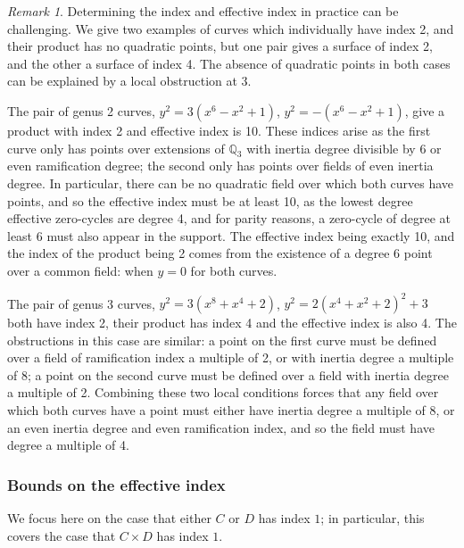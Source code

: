 \documentclass[a4paper,11pt]{amsart}
\theoremstyle{plain}
\theoremstyle{remark}
\newtheorem{remark}[thm]{Remark}
\begin{document}
\begin{remark}
    Determining the index and effective index in practice can be challenging. We give two examples of curves which individually have index 2, and their product has no quadratic points, but one pair gives a surface of index 2, and the other a surface of index 4. The absence of quadratic points in both cases can be explained by a local obstruction at 3.
    
    The pair of genus 2 curves, $y^2 = 3(x^6 - x^2 + 1)$, $y^2 = -(x^6 - x^2 + 1)$, give a product with index 2 and effective index is 10. These indices arise as the first curve only has points over extensions of $\mathbb{Q}_3$ with inertia degree divisible by 6 or even ramification degree; the second only has points over fields of even inertia degree. In particular, there can be no quadratic field over which both curves have points, and so the effective index must be at least 10, as the lowest degree effective zero-cycles are degree 4, and for parity reasons, a zero-cycle of degree at least 6 must also appear in the support. The effective index being exactly 10, and the index of the product being 2 comes from the existence of a degree 6 point over a common field: when $y = 0$ for both curves. 
    
    The pair of genus 3 curves, $y^2 = 3(x^8 + x^4 + 2)$, $y^2 = 2(x^4 + x^2 + 2)^2 + 3$ both have index 2, their product has index 4 and the effective index is also 4. The obstructions in this case are similar: a point on the first curve must be defined over a field of ramification index a multiple of 2, or with inertia degree a multiple of 8; a point on the second curve must be defined over a field with inertia degree a multiple of 2. Combining these two local conditions forces that any field over which both curves have a point must either have inertia degree a multiple of 8, or an even inertia degree and even ramification index, and so the field must have degree a multiple of 4. 
\end{remark}


\subsubsection{Bounds on the effective index}\label{subsubsec:effind}
We focus here on the case that either \(C\) or \(D\) has index \(1\); in particular, this covers the case that \(C \times D\) has index \(1\).
\end{document}
